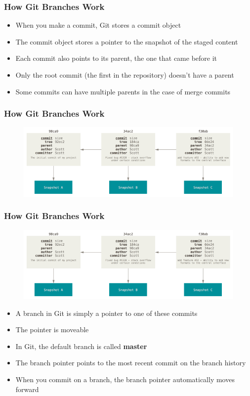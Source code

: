 \documentclass{beamer}
\begin{document}
\begin{frame}
	\frametitle{How Git Branches Work}
	\begin{itemize}
		\item{When you make a commit, Git stores a commit object}
		\item{The commit object stores a pointer to the snapshot of the staged content}
		\item{Each commit also points to its parent, the one that came before it}
		\item{Only the root commit (the first in the repository) doesn't have a parent}
		\item{Some commits can have multiple parents in the case of merge commits}
	\end{itemize}
\end{frame}

\begin{frame}
	\frametitle{How Git Branches Work}
	\begin{figure}
		\includegraphics[scale=0.40]{How_Git_Branches_Work-0.png}
	\end{figure}
\end{frame}

\begin{frame}
	\frametitle{How Git Branches Work}
	\begin{figure}
		\includegraphics[scale=0.30]{How_Git_Branches_Work-0.png}
	\end{figure}
	\begin{itemize}
		\item{A branch in Git is simply a pointer to one of these commits}
		\item{The pointer is moveable}
		\item{In Git, the default branch is called \textbf{master}}
		\item{The branch pointer points to the most recent commit on the branch history}
		\item{When you commit on a branch, the branch pointer automatically moves forward}
	\end{itemize}
\end{frame}
\end{document}
